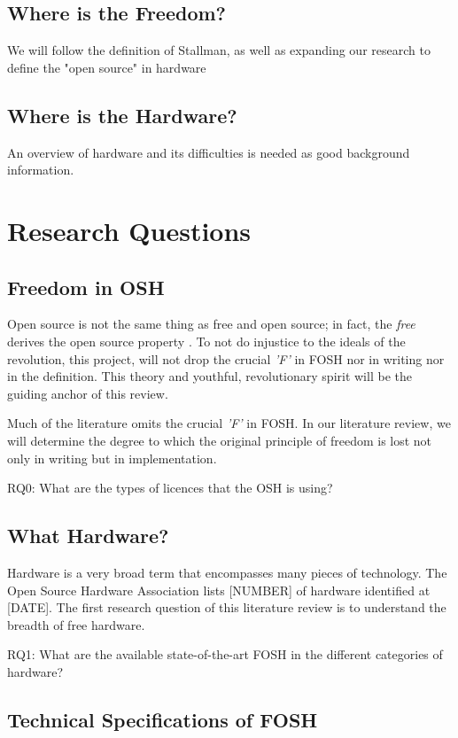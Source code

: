 \documentclass[acmtog]{acmart}
\begin{document}
\subsection{Where is the Freedom?}
We will follow the definition of Stallman\cite{b0_stallman}, as well as expanding our research to define the "open source" in hardware
\subsection{Where is the Hardware?}
An overview of hardware and its difficulties is needed as good background information. 

\section{Research Questions}

\subsection{Freedom in OSH}
Open source is not the same thing as free and open source; in fact, the \textit{free} derives the open source property \cite{b0_stallman}. 
To not do injustice to the ideals of the revolution, this project, will not drop the crucial \textit{'F'} in FOSH nor in writing nor in the definition.
This theory and youthful, revolutionary spirit will be the guiding anchor of this review.

Much of the literature omits the crucial \textit{'F'} in FOSH.
In our literature review, we will determine the degree to which the original principle of freedom is lost not only in writing but in implementation.

RQ0: What are the types of licences that the OSH is using?

\subsection{What Hardware?}
\label{RQ1}
Hardware is a very broad term that encompasses many pieces of technology.
The Open Source Hardware Association lists [NUMBER] of hardware identified at [DATE].
The first research question of this literature review is to understand the breadth of free hardware.

RQ1: What are the available state-of-the-art FOSH in the different categories of hardware?

\subsection{Technical Specifications of FOSH}
\end{document}

